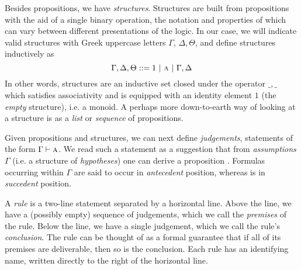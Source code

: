 Besides propositions, we have \textit{structures}. 
Structures are built from propositions with the aid of a single binary operation, the notation and properties of which can vary between different presentations of the logic.
In our case, we will indicate valid structures with Greek uppercase letters $\Gamma$, $\Delta, \Theta$, and define structures inductively as 
\[
	\Gamma, \Delta, \Theta ::= 1 \ | \ \prop{A} \ | \ \Gamma, \Delta
\]
In other words, structures are an inductive set closed under the operator $\_,\_$ which satisfies associativity and is equipped with an identity element $1$ (the \textit{empty} structure), i.e. a monoid.
A perhaps more down-to-earth way of looking at a structure is as a \textit{list} or \textit{sequence} of propositions.

Given propositions and structures, we can next define \textit{judgements}, statements of the form
$\Gamma \vdash \prop{A}$.
We read such a statement as a suggestion that from \textit{assumptions} $\Gamma$ (i.e. a structure of \textit{hypotheses}) one can derive a proposition .
Formulas occurring within $\Gamma$ are said to occur in \textit{antecedent} position, whereas  is in \textit{succedent} position.

A \textit{rule} is a two-line statement separated by a horizontal line.
Above the line, we have a (possibly empty) sequence of judgements, which we call the \textit{premises} of the rule.
Below the line, we have a single judgement, which we call the rule's \textit{conclusion}.
The rule can be thought of as a formal guarantee that if all of its premises are deliverable, then so is the conclusion.
Each rule has an identifying name, written directly to the right of the horizontal line.

